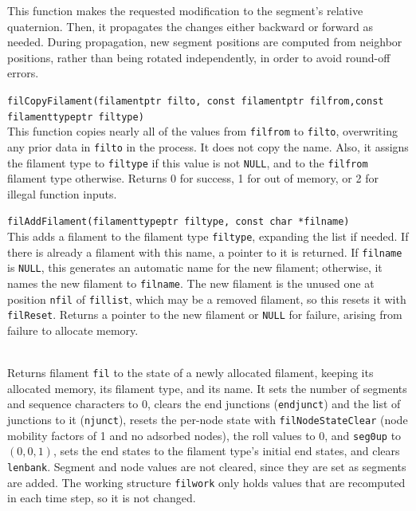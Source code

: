 \documentclass {scrbook}
\newcommand {\ttt} {\texttt}
\begin{document}
\begin{description}
This function makes the requested modification to the segment's relative quaternion. Then, it propagates the changes either backward or forward as needed. During propagation, new segment positions are computed from neighbor positions, rather than being rotated independently, in order to avoid round-off errors.

\item[\ttt{int}]
\ttt{filCopyFilament(filamentptr filto, const filamentptr filfrom,const filamenttypeptr filtype)}
\hfill \\
This function copies nearly all of the values from \ttt{filfrom} to \ttt{filto}, overwriting any prior data in \ttt{filto} in the process. It does not copy the name. Also, it assigns the filament type to \ttt{filtype} if this value is not \ttt{NULL}, and to the \ttt{filfrom} filament type otherwise. Returns 0 for success, 1 for out of memory, or 2 for illegal function inputs.

\item[\ttt{filamentptr}]
\ttt{filAddFilament(filamenttypeptr filtype, const char *filname)}
\hfill \\
This adds a filament to the filament type \ttt{filtype}, expanding the list if needed. If there is already a filament with this name, a pointer to it is returned. If \ttt{filname} is \ttt{NULL}, this generates an automatic name for the new filament; otherwise, it names the new filament to \ttt{filname}. The new filament is the unused one at position \ttt{nfil} of \ttt{fillist}, which may be a removed filament, so this resets it with \ttt{filReset}. Returns a pointer to the new filament or \ttt{NULL} for failure, arising from failure to allocate memory.

\item[\ttt{void filReset(filamentptr fil)}] %
\hfill \\
Returns filament \ttt{fil} to the state of a newly allocated filament, keeping its allocated memory, its filament type, and its name. It sets the number of segments and sequence characters to 0, clears the end junctions (\ttt{endjunct}) and the list of junctions to it (\ttt{njunct}), resets the per-node state with \ttt{filNodeStateClear} (node mobility factors of 1 and no adsorbed nodes), the roll values to 0, and \ttt{seg0up} to $(0,0,1)$, sets the end states to the filament type's initial end states, and clears \ttt{lenbank}. Segment and node values are not cleared, since they are set as segments are added. The working structure \ttt{filwork} only holds values that are recomputed in each time step, so it is not changed.


\end{description}
\end{document}
